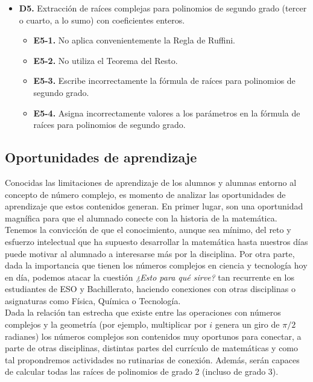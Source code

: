\documentclass[../main.tex]{memoir}
\begin{document}
\begin{itemize}
	\item \textbf{D5.} Extracción de raíces complejas para polinomios de segundo grado (tercer o cuarto, a lo sumo) con coeficientes enteros.
	\begin{itemize}
		\item \textbf{E5-1.} No aplica convenientemente la Regla de Ruffini.
		\item \textbf{E5-2.} No utiliza el Teorema del Resto.
		\item \textbf{E5-3.} Escribe incorrectamente la fórmula de raíces para polinomios de segundo grado.
		\item \textbf{E5-4.} Asigna incorrectamente valores a los parámetros en la fórmula de raíces para polinomios de segundo grado.
	\end{itemize}
\end{itemize} 


\subsection{Oportunidades de aprendizaje}

Conocidas las limitaciones de aprendizaje de los alumnos y alumnas entorno al concepto de número complejo, es momento de analizar las oportunidades de aprendizaje que estos contenidos generan. En primer lugar, son una oportunidad magnífica para que el alumnado conecte con la historia de la matemática. Tenemos la convicción de que el conocimiento, aunque sea mínimo, del reto y esfuerzo intelectual que ha supuesto desarrollar la matemática hasta nuestros días puede motivar al alumnado a interesarse más por la disciplina. Por otra parte, dada la importancia que tienen los números complejos en ciencia y tecnología hoy en día, podemos atacar la cuestión \textit{¿Esto para qué sirve?} tan recurrente en los estudiantes de ESO y Bachillerato, haciendo conexiones con otras disciplinas o asignaturas como Física, Química o Tecnología. \\

Dada la relación tan estrecha que existe entre las operaciones con números complejos y la geometría (por ejemplo, multiplicar por $i$ genera un giro de $\pi/2$ radianes) los números complejos son contenidos muy oportunos para conectar, a parte de otras disciplinas, distintas partes del currículo de matemáticas y como tal propondremos actividades no rutinarias de conexión. Además, serán capaces de calcular todas las raíces de polinomios de grado 2 (incluso de grado 3).\\
\end{document}
